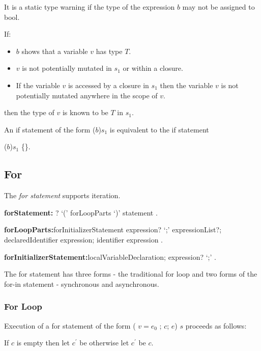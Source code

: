 \documentclass{article}
\newcommand{\code}[1]{{\sf #1}}
\begin{document}
\begin{itemize}
\LMHash{}
  It is a static type warning if the type of the expression $b$ may not be assigned to \code{bool}.

\LMHash{}
If:
\begin{itemize}
\item  $b$ shows that a variable $v$ has type $T$.
\item  $v$ is not potentially mutated in $s_1$ or within a closure.
\item If the variable $v$ is accessed by a closure in $s_1$ then the variable $v$ is not potentially mutated anywhere in the scope of $v$.
\end{itemize}
then the type of $v$ is known to be $T$ in $s_1$.

\LMHash{}
 An if statement of the form  \code {\IF{} (}$b$\code{)}$s_1$ is equivalent to the if statement

 \code {\IF{} (}$b$\code{)}$s_1$ \code{\ELSE{} \{\}}.



\subsection{For}

\LMHash{}
The {\em for statement} supports iteration.

\begin{grammar}
{\bf forStatement:}
     \AWAIT? \FOR{} `(' forLoopParts `)' statement
    .

{\bf forLoopParts:}forInitializerStatement expression? `{\escapegrammar ;}' expressionList?;
      declaredIdentifier \IN{} expression;
      identifier \IN{} expression
    .

{\bf forInitializerStatement:}localVariableDeclaration;
      expression? `{\escapegrammar ;}'
    .
 \end{grammar}

\LMHash{}
 The for statement has three forms - the traditional for loop and two forms of the for-in statement - synchronous and asynchronous.

\subsubsection{For Loop}


\LMHash{}
Execution of a for statement of the form   \code{ \FOR{} (\VAR{} $v = e_0$ ; $c$; $e$) $s$} proceeds as follows:

\LMHash{}
If $c$ is empty then let $c^\prime$ be \TRUE{} otherwise let  $c^\prime$ be $c$.


\end{itemize}
\end{document}
